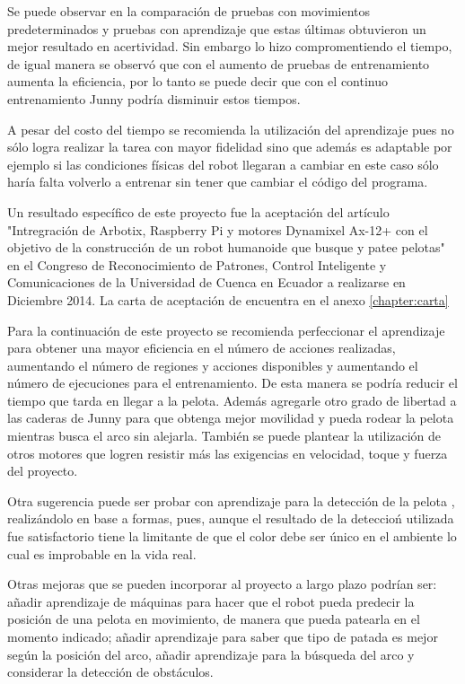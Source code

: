 Se puede observar en la comparaci\'on de pruebas con movimientos predeterminados y pruebas con aprendizaje que estas \'ultimas obtuvieron un mejor resultado en acertividad. Sin embargo  lo hizo compromentiendo el tiempo, de igual manera se observ\'o que con el aumento de pruebas de entrenamiento aumenta la eficiencia, por lo tanto se puede decir que con el continuo entrenamiento Junny podr\'ia disminuir estos tiempos. 

A pesar del costo del tiempo se recomienda la utilizaci\'on del aprendizaje pues no s\'olo logra realizar la tarea con mayor fidelidad sino que adem\'as es adaptable por ejemplo si las condiciones f\'isicas del robot llegaran a cambiar en este caso s\'olo haría falta volverlo a entrenar sin tener que cambiar el código del programa.

Un resultado espec\'ifico de este proyecto fue la aceptaci\'on del art\'iculo "Intregraci\'on de Arbotix, Raspberry Pi y motores Dynamixel Ax-12+ con el objetivo de la construcción de un robot humanoide que busque  y patee pelotas" \cite{junny} en el Congreso de Reconocimiento de Patrones, Control Inteligente y Comunicaciones de la Universidad de Cuenca en Ecuador a realizarse en Diciembre 2014. La carta de aceptaci\'on de encuentra en el anexo \ref{chapter:carta}

Para la continuaci\'on de este proyecto se recomienda perfeccionar el aprendizaje para obtener una mayor eficiencia en el n\'umero de acciones realizadas, aumentando el número de regiones y acciones disponibles y aumentando el número de ejecuciones para el entrenamiento. De esta manera se podría reducir el tiempo que tarda en llegar a la pelota. Además agregarle otro grado de libertad a las 
caderas de Junny para que obtenga mejor movilidad y pueda rodear la pelota mientras busca el arco sin alejarla. Tambi\'en se puede plantear la utilizaci\'on de otros motores que logren resistir m\'as las exigencias en velocidad, toque y fuerza del proyecto.

Otra sugerencia puede ser probar con aprendizaje para la detecci\'on de la pelota , realiz\'andolo en base a formas, pues, aunque el resultado de la deteccio\'n utilizada fue satisfactorio tiene la limitante de que el color debe ser \'unico en el ambiente lo cual es improbable en la vida real.  

Otras mejoras que se pueden incorporar al proyecto a largo plazo podrían ser: añadir aprendizaje de m\'aquinas para hacer que el robot pueda predecir la posición de una pelota en movimiento, de manera que pueda patearla en el momento indicado; a\~nadir aprendizaje para saber que tipo de patada es mejor seg\'un la posición del arco, a\~nadir aprendizaje para la búsqueda del arco y considerar la detecci\'on de obst\'aculos.

